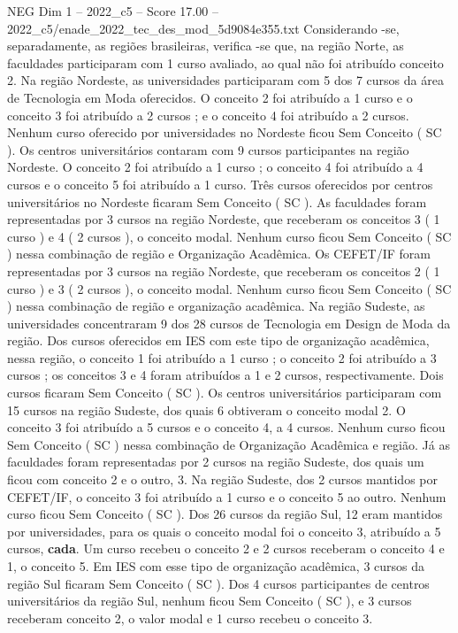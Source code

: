 \begin{textsample}{NEG Dim 1 – 2022\_c5 – Score 17.00 – 2022\_c5/enade\_2022\_tec\_des\_mod\_5d9084e355.txt}
Considerando -se, separadamente, as regiões brasileiras, verifica -se que, na região Norte, as faculdades participaram com 1 curso avaliado, ao qual não foi atribuído conceito 2.
Na região Nordeste, as universidades participaram com 5 dos 7 cursos da área de Tecnologia em Moda oferecidos.
O conceito 2 foi atribuído a 1 curso e o conceito 3 foi atribuído a 2 cursos ; e o conceito 4 foi atribuído a 2 cursos.
Nenhum curso oferecido por universidades no Nordeste ficou Sem Conceito ( SC ).
Os centros universitários contaram com 9 cursos participantes na região Nordeste.
O conceito 2 foi atribuído a 1 curso ; o conceito 4 foi atribuído a 4 cursos e o conceito 5 foi atribuído a 1 curso.
Três cursos oferecidos por centros universitários no Nordeste ficaram Sem Conceito ( SC ).
As faculdades foram representadas por 3 cursos na região Nordeste, que receberam os conceitos 3 ( 1 curso ) e 4 ( 2 cursos ), o conceito modal.
Nenhum curso ficou Sem Conceito ( SC ) nessa combinação de região e Organização Acadêmica.
Os CEFET/IF foram representadas por 3 cursos na região Nordeste, que receberam os conceitos 2 ( 1 curso ) e 3 ( 2 cursos ), o conceito modal.
Nenhum curso ficou Sem Conceito ( SC ) nessa combinação de região e organização acadêmica.
Na região Sudeste, as universidades concentraram 9 dos 28 cursos de Tecnologia em Design de Moda da região.
Dos cursos oferecidos em IES com este tipo de organização acadêmica, nessa região, o conceito 1 foi atribuído a 1 curso ; o conceito 2 foi atribuído a 3 cursos ; os conceitos 3 e 4 foram atribuídos a 1 e 2 cursos, respectivamente.
Dois cursos ficaram Sem Conceito ( SC ).
Os centros universitários participaram com 15 cursos na região Sudeste, dos quais 6 obtiveram o conceito modal 2.
O conceito 3 foi atribuído a 5 cursos e o conceito 4, a 4 cursos.
Nenhum curso ficou Sem Conceito ( SC ) nessa combinação de Organização Acadêmica e região.
Já as faculdades foram representadas por 2 cursos na região Sudeste, dos quais um ficou com conceito 2 e o outro, 3.
Na região Sudeste, dos 2 cursos mantidos por CEFET/IF, o conceito 3 foi atribuído a 1 curso e o conceito 5 ao outro.
Nenhum curso ficou Sem Conceito ( SC ).
Dos 26 cursos da região Sul, 12 eram mantidos por universidades, para os quais o conceito modal foi o conceito 3, atribuído a 5 cursos, \textbf{cada}.
Um curso recebeu o conceito 2 e 2 cursos receberam o conceito 4 e 1, o conceito 5.
Em IES com esse tipo de organização acadêmica, 3 cursos da região Sul ficaram Sem Conceito ( SC ).
Dos 4 cursos participantes de centros universitários da região Sul, nenhum ficou Sem Conceito ( SC ), e 3 cursos receberam conceito 2, o valor modal e 1 curso recebeu o conceito 3.

\end{textsample}

